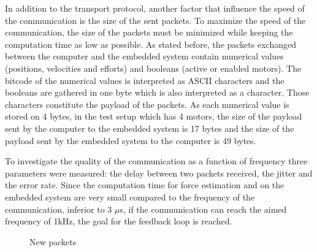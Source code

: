 In addition to the transport protocol, another factor that influence the speed of the communication is the size of the sent packets. To maximize the speed of the communication, the size of the packets must be minimized while keeping the computation time as low as possible. As stated before, the packets exchanged between the computer and the embedded system contain numerical values (positions, velocities and efforts) and booleans (active or enabled motors). The bitcode of the numerical values is interpreted as ASCII characters and the booleans are gathered in one byte which is also interpreted as a character. Those characters constitute the payload of the packets. As each numerical value is stored on 4 bytes, in the test setup which has 4 motors, the size of the payload sent by the computer to the embedded system is 17 bytes and the size of the payload sent by the embedded system to the computer is 49 bytes.

To investigate the quality of the communication as a function of frequency three parameters were measured: the delay between two packets received, the jitter and the error rate. Since the computation time for force estimation and on the embedded system are very small compared to the frequency of the communication, inferior to 3 $\mu$s, if the communication can reach the aimed frequency of 1kHz, the goal for the feedback loop is reached.
\begin{figure}[h]
\caption{New packets}
\end{figure}
